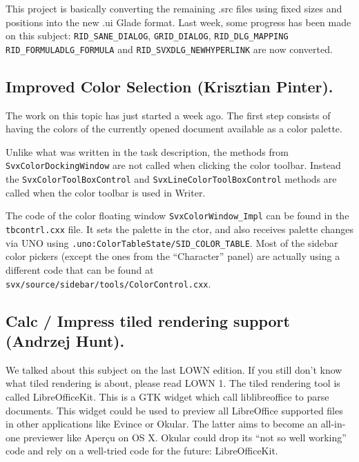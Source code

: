 \documentclass{article}
\begin{document}
\label{dialogWidgetConversion}
This project is basically converting the remaining .src files using fixed sizes and positions into the new .ui Glade format. Last week, some progress has been made on this subject: \lstinline|RID_SANE_DIALOG|, \lstinline|GRID_DIALOG|, \lstinline|RID_DLG_MAPPING| \lstinline|RID_FORMULADLG_FORMULA| and \lstinline|RID_SVXDLG_NEWHYPERLINK| are now converted\cite{gsocDialogWidgetWeek4}.

\subsection{Improved Color Selection (Krisztian Pinter).}

The work on this topic has just started a week ago. The first step consists of having the colors of the currently opened document available as a color palette.

Unlike what was written in the task description, the methods from \lstinline|SvxColorDockingWindow|\cite{gsocColorSelectionMethod1} are not called when clicking the color toolbar. Instead the \lstinline|SvxColorToolBoxControl|\cite{gsocColorSelectionMethod2} and \lstinline|SvxLineColorToolBoxControl| methods are called when the color toolbar is used in Writer\cite{gsocColorSelection}.

The code of the color floating window \lstinline|SvxColorWindow_Impl| can be found in the \lstinline|tbcontrl.cxx| file. It sets the palette in the ctor, and also receives palette changes via UNO using 
\lstinline|.uno:ColorTableState/SID_COLOR_TABLE|.
Most of the sidebar color pickers (except the ones from 
the ``Character'' panel) are actually using a different code that can be found 
at \lstinline|svx/source/sidebar/tools/ColorControl.cxx|.

\subsection{Calc / Impress tiled rendering support (Andrzej Hunt).}

We talked about this subject on the last LOWN edition. If you still don't know what tiled rendering is about, please read LOWN 1. The tiled rendering tool is called LibreOfficeKit. This is a GTK widget which call liblibreoffice to parse documents. This widget could be used to preview all LibreOffice supported files in other applications like Evince or Okular. The latter aims to become an all-in-one previewer like Aperçu on OS X. Okular could drop its ``not so well working'' code and rely on a well-tried code for the future: LibreOfficeKit\cite{libreofficeKit}\cite{gsocLibreOfficeKit}.
\end{document}
